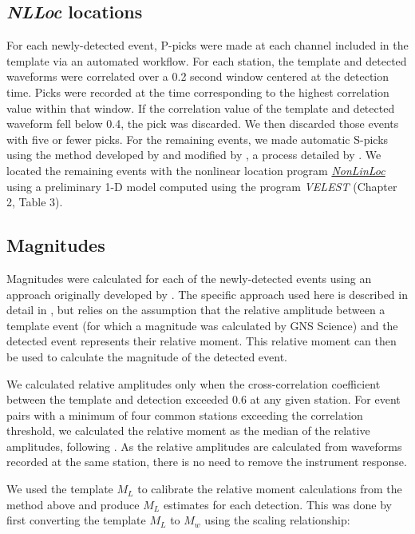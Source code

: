 \subsection{\textit{NLLoc} locations}
For each newly-detected event, P-picks were made at each channel included in the template via an automated workflow. For each station, the template and detected waveforms were correlated over a 0.2 second window centered at the detection time. Picks were recorded at the time corresponding to the highest correlation value within that window. If the correlation value of the template and detected waveform fell below 0.4, the pick was discarded. We then discarded those events with five or fewer picks. For the remaining events, we made automatic S-picks using the method developed by \citet{Diehl_2009} and modified by \citet{Castellazzi_2015}, a process detailed by \citep{mroczek_2019}. We located the remaining events with the nonlinear location program \href{http://alomax.free.fr/nlloc/}{\textit{NonLinLoc}} \citep{Lomax_2014} using a preliminary 1-D model computed using the program \textit{VELEST} \citep{Kissling_1994,sewell2017}(Chapter 2, Table 3).

\subsection{Magnitudes}
Magnitudes were calculated for each of the newly-detected events using an approach originally developed by \citet{Shelly_2016}. The specific approach used here is described in detail in \citet{j2019}, but relies on the assumption that the relative amplitude between a template event (for which a magnitude was calculated by GNS Science) and the detected event represents their relative moment. This relative moment can then be used to calculate the magnitude of the detected event.

We calculated relative amplitudes only when the cross-correlation coefficient between the template and detection exceeded 0.6 at any given station. For event pairs with a minimum of four common stations exceeding the correlation threshold, we calculated the relative moment as the median of the relative amplitudes, following \citet{Shelly_2016}. As the relative amplitudes are calculated from waveforms recorded at the same station, there is no need to remove the instrument response.

We used the template $M_{L}$ to calibrate the relative moment calculations from the method above and produce $M_{L}$ estimates for each detection. This was done by first converting the template $M_{L}$ to $M_{w}$ using the scaling relationship:

